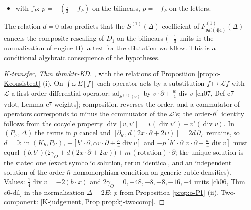 \begin{theorem}
\begin{itemize}
\item with $f_P$: $p=-(\tfrac13+f_P)$ on the bilinears, $p=-f_P$ on the letters.
\end{itemize}
The relation $d=0$ also predicts that the $S^{(1)}(\Delta)$-coefficient of $F^{(1)}_{\mathfrak{psl}(4|4)}(\Delta)$ cancels the composite rescaling of $D_1$ on the bilinears ($-\tfrac13$ units in the normalisation of engine B), a test for the dilatation workflow. This is a conditional algebraic consequence of the hypotheses.
\end{theorem}

\begin{proof}
[K-transfer, Thm thm:ktr-KD], with the relations of Proposition \ref{prop:o-Kconsistent} (i). On $\int\omega\,E[f]$ each operator acts by a substitution $f\mapsto\mathcal Lf$ with $\mathcal L$ a first-order differential operator: $\mathrm{ad}_{S^{(1)}(v)}$ by $v\cdot\partial+\tfrac w4\operatorname{div}v$ [ch07, Def c7-vdot, Lemma c7-weights]; composition reverses the order, and a commutator of operators corresponds to minus the commutator of the $\mathcal L$'s; the order-$\hbar^0$ identity follows from the cocycle property $\operatorname{div}[v,v']=v(\operatorname{div}v')-v'(\operatorname{div}v)$. In $(P_{b'},\Delta)$ the terms in $p$ cancel and $[\partial_{b'},d(2x\cdot\partial+2w)]=2d\,\partial_{b'}$ remains, so $d=0$; in $(K_b,P_{b'})$, $-[b'\cdot\partial,\alpha v\cdot\partial+\tfrac\kappa4\operatorname{div}v]$ and $-p[b'\cdot\partial,v\cdot\partial+\tfrac w4\operatorname{div}v]$ must equal $(b,b')\big(2\gamma_O+d(2x\cdot\partial+2w)\big)+m\,(\text{rotation})\cdot\partial$; the unique solution is the stated one (exact symbolic solution, rerun identical, and an independent solution of the order-$\hbar$ homomorphism condition on generic cubic densities). Values: $\tfrac14\operatorname{div}v=-2(b\cdot x)$ and $2\gamma_O=0,-48,-8,-8,-16,-4$ units [ch06, Thm c6-dil] in the normalisation $\Delta=2E$; $p$ from Proposition \ref{prop:o-P1} (ii). Two-component: [K-judgement, Prop prop:kj-twocomp].
\end{proof}

